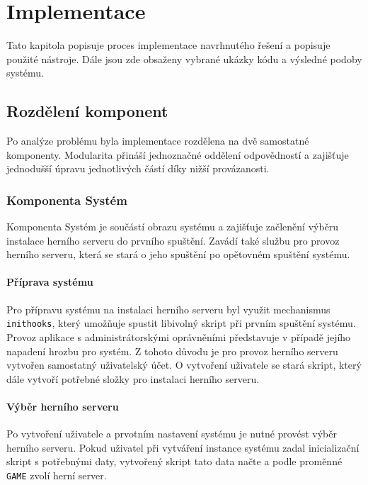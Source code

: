 \chapter{Implementace}

Tato kapitola popisuje proces implementace navrhnutého řešení a popisuje použité nástroje.
Dále jsou zde obsaženy vybrané ukázky kódu a výsledné podoby systému.

\section{Rozdělení komponent}

Po analýze problému byla implementace rozdělena na dvě samostatné komponenty. Modularita
přináší jednoznačné oddělení odpovědností a zajišťuje jednodušší úpravu jednotlivých částí
díky nižší provázanosti.

\subsection{Komponenta Systém}

Komponenta Systém je součástí obrazu systému a zajišťuje začlenění výběru instalace herního serveru do prvního spuštění.
Zavádí také službu pro provoz herního serveru, která se stará o jeho spuštění po opětovném spuštění systému.

\subsubsection{Příprava systému}

Pro přípravu systému na instalaci herního serveru byl využit mechanismus \texttt{inithooks}, který umožňuje
spustit libivolný skript při prvním spuštění systému.
Provoz aplikace s administrátorskými oprávněními představuje v případě jejího napadení hrozbu pro systém.
Z tohoto důvodu je pro provoz herního serveru vytvořen samostatný uživatelský účet. O vytvoření uživatele se stará skript,
který dále vytvoří potřebné složky pro instalaci herního serveru.

\subsubsection{Výběr herního serveru}

Po vytvoření uživatele a prvotním nastavení systému je nutné provést výběr herního serveru.
Pokud uživatel při vytváření instance systému zadal inicializační skript s potřebnými daty, vytvořený skript tato
data načte a podle proměnné \texttt{GAME} zvolí herní server.


